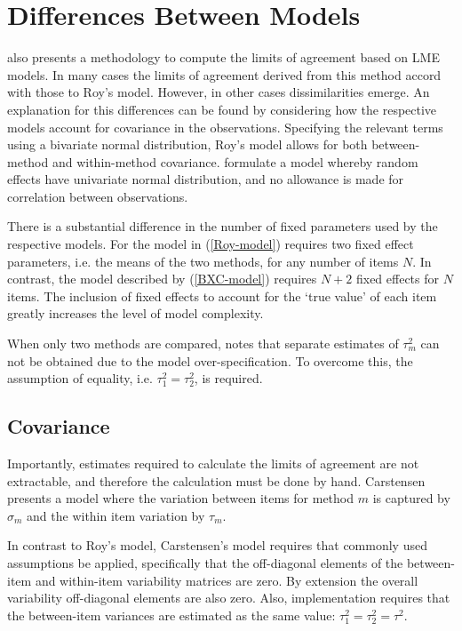 \documentclass[12pt, a4paper]{report}
\theoremstyle{plain}
\theoremstyle{definition}
\theoremstyle{remark}
\begin{document}
	
	
\section{Differences Between Models}
\citet{BXC2008} also presents a methodology to compute the limits of agreement based on LME models. In many cases the limits of agreement derived from this method accord with those to Roy's model. However, in other cases dissimilarities emerge. An explanation for this differences can be found by considering how the respective models account for covariance in the observations. Specifying the relevant terms using a bivariate normal distribution, Roy's model allows for both between-method and within-method covariance. \citet{BXC2008} formulate a model whereby random effects have univariate normal distribution, and no allowance is made for correlation between observations.



There is a substantial difference in the number of fixed parameters used by the respective models. For the model in (\ref{Roy-model}) requires two fixed effect parameters, i.e. the means of the two methods, for any number of items $N$. In contrast, the model described by (\ref{BXC-model}) requires $N+2$ fixed effects for $N$ items. The inclusion of fixed effects to account for the `true value' of each item greatly increases the level of model complexity.

When only two methods are compared, \citet{BXC2008} notes that separate estimates of $\tau^2_m$ can not be obtained due to the model over-specification. To overcome this, the assumption of equality, i.e. $\tau^2_1 = \tau^2_2$, is required.




\subsection{Covariance}



Importantly, estimates required to calculate the limits of agreement are not extractable, and therefore the calculation must
be done by hand.
Carstensen presents a model where the variation between items for
method $m$ is captured by $\sigma_m$ and the within item variation
by $\tau_m$.


In contrast to Roy's model, Carstensen's model requires that commonly used assumptions be applied, specifically that the off-diagonal elements of the between-item and within-item variability matrices are zero. By
extension the overall variability off-diagonal elements are also zero. Also, implementation requires that the between-item variances are estimated as the same value: $\tau^2_1 = \tau^2_2 = \tau^2$.
\end{document}
